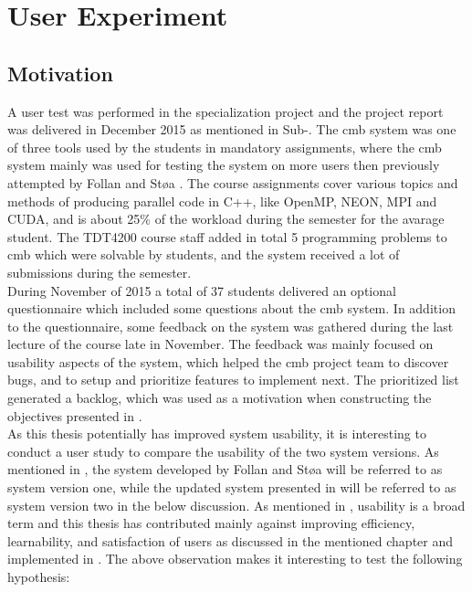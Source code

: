 \section{User Experiment}
\label{sec:user-testing}

\subsection{Motivation}
A user test was performed in the specialization project and the project report was delivered in December 2015 as mentioned in Sub-. The \gls{cmb} system was one of three tools used by the students in mandatory assignments, where the \gls{cmb} system mainly was used for testing the system on more users then previously attempted by Follan and Støa \cite{mt:T&S}. The course assignments cover various topics and methods of producing parallel code in C++, like OpenMP, NEON, MPI and CUDA, and is about 25\% of the workload during the semester for the avarage student. The TDT4200 course staff added in total 5 programming problems to \gls{cmb} which were solvable by students, and the system received a lot of submissions during the semester. \\

During November of 2015 a total of 37 students delivered an optional questionnaire which included some questions about the \gls{cmb} system. In addition to the questionnaire, some feedback on the system was gathered during the last lecture of the course late in November. The feedback was mainly focused on usability aspects of the system, which helped the \gls{cmb} project team to discover bugs, and to setup and prioritize features to implement next. The prioritized list generated a backlog, which was used as a motivation when constructing the objectives presented in . \\

As this thesis potentially has improved system usability, it is interesting to conduct a user study to compare the usability of the two system versions. As mentioned in , the system developed by Follan and Støa will be referred to as system version one, while the updated system presented in  will be referred to as system version two in the below discussion. As mentioned in , usability is a broad term and this thesis has contributed mainly against improving efficiency, learnability, and satisfaction of users as discussed in the mentioned chapter and implemented in . The above observation makes it interesting to test the following hypothesis:

